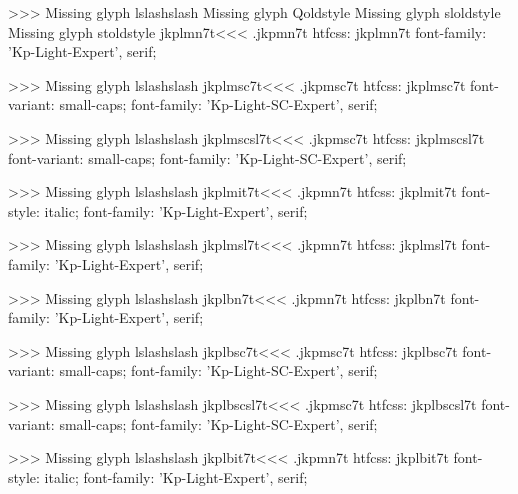 >>>
Missing glyph	lslashslash
Missing glyph	Qoldstyle
Missing glyph	sloldstyle
Missing glyph	stoldstyle
\<jkplmn7t\><<<
.jkpmn7t
htfcss:  jkplmn7t  font-family: 'Kp-Light-Expert', serif;

>>>
Missing glyph	lslashslash
\<jkplmsc7t\><<<
.jkpmsc7t
htfcss:  jkplmsc7t  font-variant: small-caps; font-family: 'Kp-Light-SC-Expert', serif;

>>>
Missing glyph	lslashslash
\<jkplmscsl7t\><<<
.jkpmsc7t
htfcss:  jkplmscsl7t  font-variant: small-caps; font-family: 'Kp-Light-SC-Expert', serif;

>>>
Missing glyph	lslashslash
\<jkplmit7t\><<<
.jkpmn7t
htfcss:  jkplmit7t  font-style: italic; font-family: 'Kp-Light-Expert', serif;

>>>
Missing glyph	lslashslash
\<jkplmsl7t\><<<
.jkpmn7t
htfcss:  jkplmsl7t  font-family: 'Kp-Light-Expert', serif;

>>>
Missing glyph	lslashslash
\<jkplbn7t\><<<
.jkpmn7t
htfcss:  jkplbn7t  font-family: 'Kp-Light-Expert', serif;

>>>
Missing glyph	lslashslash
\<jkplbsc7t\><<<
.jkpmsc7t
htfcss:  jkplbsc7t  font-variant: small-caps; font-family: 'Kp-Light-SC-Expert', serif;

>>>
Missing glyph	lslashslash
\<jkplbscsl7t\><<<
.jkpmsc7t
htfcss:  jkplbscsl7t  font-variant: small-caps; font-family: 'Kp-Light-SC-Expert', serif;

>>>
Missing glyph	lslashslash
\<jkplbit7t\><<<
.jkpmn7t
htfcss:  jkplbit7t  font-style: italic; font-family: 'Kp-Light-Expert', serif;

